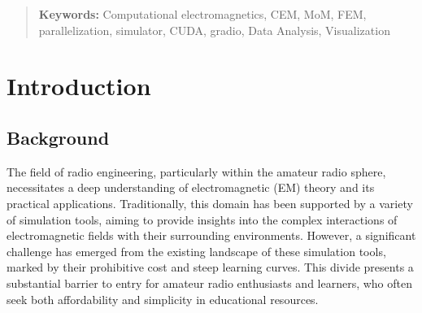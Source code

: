 \documentclass[11pt, a4paper, titlepage]{article}
\begin{document}
\begin{abstract}
	
	
	\begin{flushleft}
		{\small {\bf Keywords:} Computational electromagnetics, CEM, MoM, FEM, parallelization, simulator, CUDA, gradio, Data Analysis, Visualization}
	\end{flushleft}
	
\end{abstract}
\setcounter{page}{2}
\tableofcontents
\newpage
\section{Introduction}
\subsection{Background}
The field of radio engineering, particularly within the amateur radio sphere, necessitates a deep understanding of electromagnetic (EM) theory and its practical applications. Traditionally, this domain has been supported by a variety of simulation tools, aiming to provide insights into the complex interactions of electromagnetic fields with their surrounding environments. However, a significant challenge has emerged from the existing landscape of these simulation tools, marked by their prohibitive cost and steep learning curves. This divide presents a substantial barrier to entry for amateur radio enthusiasts and learners, who often seek both affordability and simplicity in educational resources. 
\end{document}
